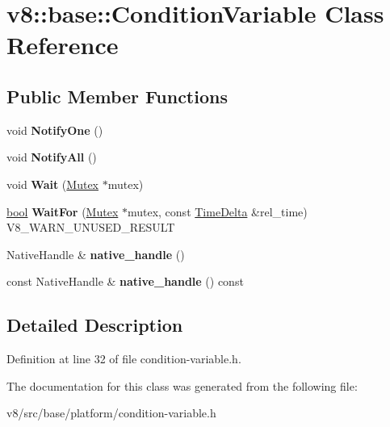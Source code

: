 \hypertarget{classv8_1_1base_1_1ConditionVariable}{}\section{v8\+:\+:base\+:\+:Condition\+Variable Class Reference}
\label{classv8_1_1base_1_1ConditionVariable}
\subsection*{Public Member Functions}
\begin{DoxyCompactItemize}
\item 
\mbox{\label{classv8_1_1base_1_1ConditionVariable_ab95e3ebf6594803215e1fea18848eb97}} 
void {\bfseries Notify\+One} ()
\item 
\mbox{\label{classv8_1_1base_1_1ConditionVariable_a28caf62e21af81a016735dd9f11010d0}} 
void {\bfseries Notify\+All} ()
\item 
\mbox{\label{classv8_1_1base_1_1ConditionVariable_a29ca064849ef418937bbedcb0900279c}} 
void {\bfseries Wait} (\mbox{\hyperlink{classv8_1_1base_1_1Mutex}{Mutex}} $\ast$mutex)
\item 
\mbox{\label{classv8_1_1base_1_1ConditionVariable_a8eed4e24b1485dc056b7bb9201581475}} 
\mbox{\hyperlink{classbool}{bool}} {\bfseries Wait\+For} (\mbox{\hyperlink{classv8_1_1base_1_1Mutex}{Mutex}} $\ast$mutex, const \mbox{\hyperlink{classv8_1_1base_1_1TimeDelta}{Time\+Delta}} \&rel\+\_\+time) V8\+\_\+\+W\+A\+R\+N\+\_\+\+U\+N\+U\+S\+E\+D\+\_\+\+R\+E\+S\+U\+LT
\item 
\mbox{\label{classv8_1_1base_1_1ConditionVariable_a372a5320ae4680df03af34cf6e605f69}} 
Native\+Handle \& {\bfseries native\+\_\+handle} ()
\item 
\mbox{\label{classv8_1_1base_1_1ConditionVariable_aafec4f457cede394dadd538539d78322}} 
const Native\+Handle \& {\bfseries native\+\_\+handle} () const
\end{DoxyCompactItemize}


\subsection{Detailed Description}


Definition at line 32 of file condition-\/variable.\+h.



The documentation for this class was generated from the following file\+:\begin{DoxyCompactItemize}
\item 
v8/src/base/platform/condition-\/variable.\+h\end{DoxyCompactItemize}
